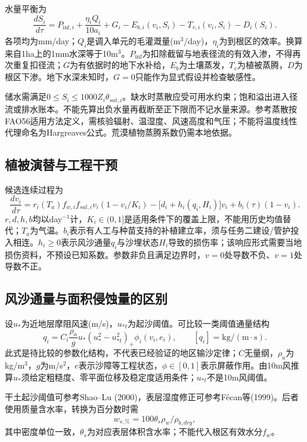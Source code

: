 \documentclass[11pt,a4paper]{ctexart}
\begin{document}
水量平衡为
\begin{equation}
 \frac{dS_i}{d\tau}=P_{\mathrm{inf},i}+\frac{\eta_iQ_i}{10a_i}+G_i-E_{b,i}(v_i,S_i)-T_{v,i}(v_i,S_i)-D_i(S_i).
\end{equation}
各项均为mm/day；$Q_i$是调入单元的毛灌溉量(m$^3$/day)，$\eta_i$为到根区的效率。换算来自1ha上的1mm水深等于10m$^3$。$P_{\mathrm{inf}}$为扣除截留与地表径流的有效入渗，不得再次重复扣径流；$G$为有依据时的地下水补给，$E_b$为土壤蒸发，$T_v$为植被蒸腾，$D$为根区下渗。地下水深未知时，$G=0$只能作为显式假设并检查敏感性。

储水需满足$0\leq S_i\leq1000Z_i\theta_{sat,i}$。缺水时蒸散应受可用水约束；饱和溢出进入径流或排水账本。不能先算出负水量再截断至正下限而不记水量来源。参考蒸散按FAO56适用方法定义，需核验辐射、温湿度、风速高度和气压；不能将温度线性代理命名为Hargreaves公式。荒漠植物蒸腾系数仍需本地依据。

\subsection{植被演替与工程干预}
候选连续过程为
\begin{equation}
 \frac{dv_i}{d\tau}=r_i(T_a)f_{w,i}f_{sal,i}v_i(1-v_i/K_i)
 -\bigl[d_i+h_i(q_i,H_i)\bigr]v_i+b_i(\tau)(1-v_i).
\end{equation}
$r,d,h,b$均以day$^{-1}$计，$K_i\in(0,1]$是适用条件下的覆盖上限，不能用历史均值替代；$T_a$为气温。$b_i$表示有人工与种苗支持的补植建立率，须与任务二建设/管护投入相连。$h_i\geq0$表示风沙通量$q_i$与沙埋状态$H_i$导致的损伤率；该响应形式需要当地损伤资料，不预设已知系数。参数非负且满足边界时，$v=0$处导数不负、$v=1$处导数不正。

\subsection{风沙通量与面积侵蚀量的区别}
设$u_*$为近地层摩阻风速(m/s)，$u_{*t}$为起沙阈值。可比较一类阈值通量结构
\begin{equation}
 q_i=C_i\frac{\rho_a}{g}u_*\left(u_*^2-u_{*t}^2\right)_+\phi_i(v_i,e_i),
 \qquad [q_i]=\mathrm{kg/(m\cdot s)}.
\end{equation}
此式是待比较的参数化结构，不代表已经验证的地区输沙定律；$C$无量纲，$\rho_a$为kg/m$^3$，$g$为m/s$^2$，$e$表示沙障等工程状态，$\phi\in[0,1]$表示屏蔽作用。由10m风推算$u_*$须给定粗糙度、零平面位移及稳定度适用条件；$u_{*t}$不是10m风阈值。

干土起沙阈值可参考Shao--Lu (2000)，表层湿度修正可参考F\'ecan等(1999)。后者使用质量含水率，转换为百分数时需
\begin{equation}
 w_{s,\%}=100\theta_s\rho_w/\rho_{b,dry},
\end{equation}
其中密度单位一致，$\theta_s$为对应表层体积含水率；不能代入根区有效水分$f_w$。
\end{document}
